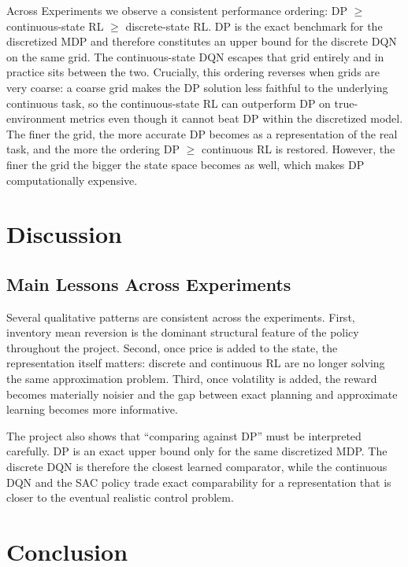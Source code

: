 \documentclass[11pt,a4paper]{article}
\begin{document}
Across Experiments we observe a consistent performance ordering: DP $\ge$ continuous-state RL $\ge$ discrete-state RL. DP is the exact benchmark for the discretized MDP and therefore constitutes an upper bound for the discrete DQN on the same grid. The continuous-state DQN escapes that grid entirely and in practice sits between the two. Crucially, this ordering reverses when grids are very coarse: a coarse grid makes the DP solution less faithful to the underlying continuous task, so the continuous-state RL can outperform DP on true-environment metrics even though it cannot beat DP within the discretized model. The finer the grid, the more accurate DP becomes as a representation of the real task, and the more the ordering DP $\ge$ continuous RL is restored. However, the finer the grid the bigger the state space becomes as well, which makes DP computationally expensive.

\section{Discussion}

\subsection{Main Lessons Across Experiments}

Several qualitative patterns are consistent across the experiments. First, inventory mean reversion is the dominant structural feature of the policy throughout the project. Second, once price is added to the state, the representation itself matters: discrete and continuous RL are no longer solving the same approximation problem. Third, once volatility is added, the reward becomes materially noisier and the gap between exact planning and approximate learning becomes more informative.

The project also shows that ``comparing against DP'' must be interpreted carefully. DP is an exact upper bound only for the same discretized MDP. The discrete DQN is therefore the closest learned comparator, while the continuous DQN and the SAC policy trade exact comparability for a representation that is closer to the eventual realistic control problem.

\section{Conclusion}
\end{document}
